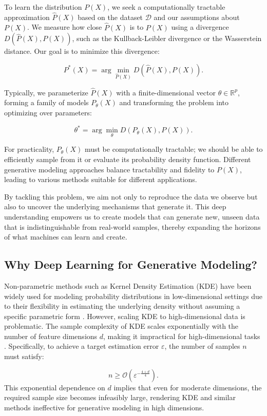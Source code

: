 To learn the distribution \( P(X) \), we seek a computationally tractable approximation \( \hat{P}(X) \) based on the dataset \( \mathcal{D} \) and our assumptions about \( P(X) \). We measure how close \( \hat{P}(X) \) is to \( P(X) \) using a divergence \( D(\hat{P}(X), P(X)) \), such as the Kullback-Leibler divergence or the Wasserstein distance. Our goal is to minimize this divergence:

\[
P^{\ast}(X) = \arg \min_{\hat{P}(X)} D(\hat{P}(X), P(X)).
\]

Typically, we parameterize \( \hat{P}(X) \) with a finite-dimensional vector \( \theta \in \mathbb{R}^p \), forming a family of models \( P_{\theta}(X) \) and transforming the problem into optimizing over parameters:

\[
\theta^* = \arg \min_\theta D(P_{\theta}(X), P(X)).
\]

For practicality, \( P_{\theta}(X) \) must be computationally tractable; we should be able to efficiently sample from it or evaluate its probability density function. Different generative modeling approaches balance tractability and fidelity to \( P(X) \), leading to various methods suitable for different applications.

By tackling this problem, we aim not only to reproduce the data we observe but also to uncover the underlying mechanisms that generate it. This deep understanding empowers us to create models that can generate new, unseen data that is indistinguishable from real-world samples, thereby expanding the horizons of what machines can learn and create.

\subsection{Why Deep Learning for Generative Modeling?}

Non-parametric methods such as Kernel Density Estimation (KDE) have been widely used for modeling probability distributions in low-dimensional settings due to their flexibility in estimating the underlying density without assuming a specific parametric form \cite{silverman1986density}. However, scaling KDE to high-dimensional data is problematic. The sample complexity of KDE scales exponentially with the number of feature dimensions \( d \), making it impractical for high-dimensional tasks \cite{wasserman2006all}. Specifically, to achieve a target estimation error \( \varepsilon \), the number of samples \( n \) must satisfy:

\[
n \geq \mathcal{O}\left(\varepsilon^{-\frac{4 + d}{4}}\right).
\]
\cite{scott2015multivariate}
This exponential dependence on \( d \) implies that even for moderate dimensions, the required sample size becomes infeasibly large, rendering KDE and similar methods ineffective for generative modeling in high dimensions.

